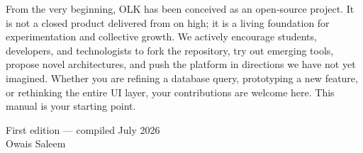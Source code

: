 From the very beginning, OLK has been conceived as an open‑source project. It is not a closed product delivered from on high; it is a living foundation for experimentation and collective growth. We actively encourage students, developers, and technologists to fork the repository, try out emerging tools, propose novel architectures, and push the platform in directions we have not yet imagined. Whether you are refining a database query, prototyping a new feature, or rethinking the entire UI layer, your contributions are welcome here. This manual is your starting point.

\vfill

\begin{flushright}
	First edition — compiled July 2026 \\
	Owais Saleem
\end{flushright}